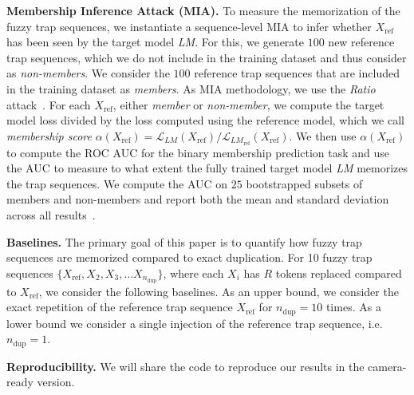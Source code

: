 \textbf{Membership Inference Attack (MIA).} To measure the memorization of the fuzzy trap sequences, we instantiate a sequence-level MIA to infer whether $X_{\text{ref}}$ has been seen by the target model \textit{LM}. For this, we generate $100$ new reference trap sequences, which we do not include in the training dataset and thus consider as \emph{non-members}. We consider the $100$ reference trap sequences that are included in the training dataset as \emph{members}. As MIA methodology, we use the \textit{Ratio} attack~\cite{carlini2021extracting}. For each $X_{\text{ref}}$, either \emph{member} or \emph{non-member}, we compute the target model loss divided by the loss computed using the reference model, which we call \emph{membership score} $\alpha(X_{\text{ref}}) = \mathcal{L}_{\textit{LM}}(X_{\text{ref}}) / \mathcal{L}_{\textit{LM}_{\text{ref}}}(X_{\text{ref}})$. We then use $\alpha(X_{\text{ref}})$ to compute the ROC AUC for the binary membership prediction task and use the AUC to measure to what extent the fully trained target model \textit{LM} memorizes the trap sequences. We compute the AUC on $25$ bootstrapped subsets of members and non-members and report both the mean and standard deviation across all results~\cite{bertail2008bootstrapping}. %

\textbf{Baselines.} The primary goal of this paper is to quantify how fuzzy trap sequences are memorized compared to exact duplication. For 10 fuzzy trap sequences $\{X_\text{ref}, X_2, X_3, \ldots X_{n_{\text{dup}}}\}$, where each $X_i$ has $R$ tokens replaced compared to $X_{\text{ref}}$, we consider the following baselines. As an upper bound, we consider the exact repetition of the reference trap sequence $X_{\text{ref}}$ for $n_{\text{dup}}=10$ times. As a lower bound we consider a single injection of the reference trap sequence, i.e. $n_{\text{dup}}=1$. 

\textbf{Reproducibility.} We will share the code to reproduce our results in the camera-ready version.